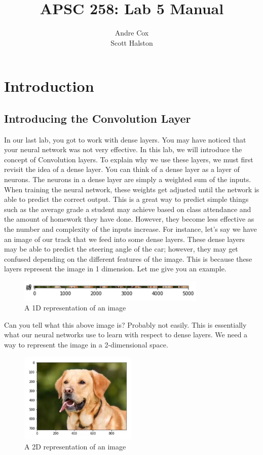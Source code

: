 \documentclass[11pt]{report}
\title{APSC 258: Lab 5 Manual}
\author{Andre Cox \\ Scott Halston}
\begin{document}
\maketitle
\tableofcontents

\clearpage

\chapter{Introduction}
\section{Introducing the Convolution Layer}
In our last lab, you got to work with dense layers. You may have noticed that your neural network was not very effective. In this lab, we will introduce the concept of Convolution layers. To explain why we use these layers, we must first revisit the idea of a dense layer. You can think of a dense layer as a layer of neurons. The neurons in a dense layer are simply a weighted sum of the inputs. When training the neural network, these weights get adjusted until the network is able to predict the correct output. This is a great way to predict simple things such as the average grade a student may achieve based on class attendance and the amount of homework they have done. However, they become less effective as the number and complexity of the inputs increase. For instance, let's say we have an image of our track that we feed into some dense layers. These dense layers may be able to predict the steering angle of the car; however, they may get confused depending on the different features of the image. This is because these layers represent the image in 1 dimension. Let me give you an example.

\begin{figure}[h]
\centering
\includegraphics[width=0.8\textwidth]{./images/dogdense.png}
\caption{A 1D representation of an image}
\label{fig:1d}
\end{figure}

Can you tell what this above image is? Probably not easily. This is essentially what our neural networks use to learn with respect to dense layers. We need a way to represent the image in a 2-dimensional space.

\begin{figure}[h]
\centering
\includegraphics[width=0.5\textwidth]{./images/dogconv.png}
\caption{A 2D representation of an image}
\label{fig:2d}
\end{figure}
\end{document}
